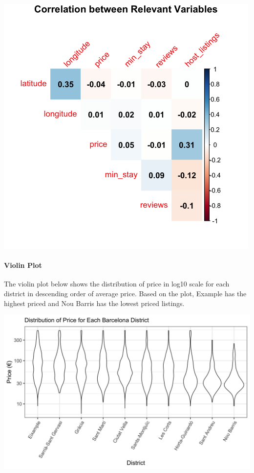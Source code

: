 \documentclass[]{article}
\let\oldparagraph\paragraph
\renewcommand{\paragraph}[1]{\oldparagraph{#1}\mbox{}}
\begin{document}
\includegraphics[width=5.20833in,height=\textheight]{../images/correlogram.png}

\hypertarget{violin-plot}{%
\paragraph{Violin Plot}\label{violin-plot}}

The violin plot below shows the distribution of price in log10 scale for
each district in descending order of average price. Based on the plot,
Example has the highest priced and Nou Barris has the lowest priced
listings.

\includegraphics[width=7.03125in,height=\textheight]{../images/violin_plot.png}
\end{document}
